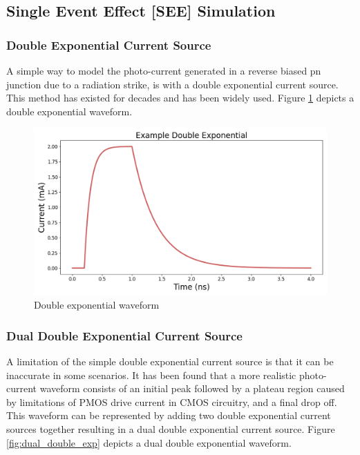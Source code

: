\documentclass[conference]{IEEEtran}
\begin{document}
    \subsection{Single Event Effect [SEE] Simulation}\label{subsec:single-event-effect-[see]-simulation}

    \subsubsection{Double Exponential Current Source}
    A simple way to model the photo-current generated in a reverse biased pn junction due to a radiation strike, is with a double exponential current source. This method has existed for decades and has been widely used. Figure \ref{fig:double_exp} depicts a double exponential waveform.

    \begin{figure}[htbp]
        \centering
        \includegraphics[width=0.95\linewidth]{EX_Double_Exponential}
        \caption{Double exponential waveform}
        \label{fig:double_exp}
    \end{figure}

    \subsubsection{Dual Double Exponential Current Source}
    A limitation of the simple double exponential current source is that it can be inaccurate in some scenarios.
    It has been found that a more realistic photo-current waveform consists of an initial peak followed by a plateau region caused by limitations of PMOS drive current in CMOS circuitry, and a final drop off.
    This waveform can be represented by adding two double exponential current sources together resulting in a dual double exponential current source. Figure \ref{fig:dual_double_exp} depicts a dual double exponential waveform. \cite{Black2015}
    \vspace{1em}
\end{document}
